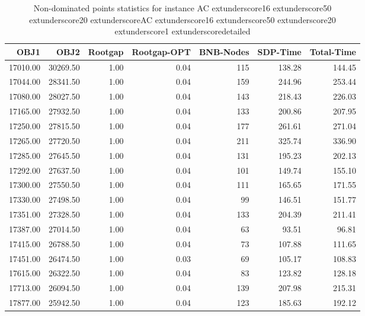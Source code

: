 \begin{table}
\caption{Non-dominated points statistics for instance AC	extunderscore16	extunderscore50	extunderscore20	extunderscoreAC	extunderscore16	extunderscore50	extunderscore20	extunderscore1	extunderscoredetailed}
\label{tab:stats/AC_16_50_20_AC_16_50_20_1_detailed}
\begin{tabular}{rrrrrrr}
\toprule
OBJ1 & OBJ2 & Rootgap & Rootgap-OPT & BNB-Nodes & SDP-Time & Total-Time \\
\midrule
17010.00 & 30269.50 & 1.00 & 0.04 & 115 & 138.28 & 144.45 \\
17044.00 & 28341.50 & 1.00 & 0.04 & 159 & 244.96 & 253.44 \\
17080.00 & 28027.50 & 1.00 & 0.04 & 143 & 218.43 & 226.03 \\
17165.00 & 27932.50 & 1.00 & 0.04 & 133 & 200.86 & 207.95 \\
17250.00 & 27815.50 & 1.00 & 0.04 & 177 & 261.61 & 271.04 \\
17265.00 & 27720.50 & 1.00 & 0.04 & 211 & 325.74 & 336.90 \\
17285.00 & 27645.50 & 1.00 & 0.04 & 131 & 195.23 & 202.13 \\
17292.00 & 27637.50 & 1.00 & 0.04 & 101 & 149.74 & 155.10 \\
17300.00 & 27550.50 & 1.00 & 0.04 & 111 & 165.65 & 171.55 \\
17330.00 & 27498.50 & 1.00 & 0.04 & 99 & 146.51 & 151.77 \\
17351.00 & 27328.50 & 1.00 & 0.04 & 133 & 204.39 & 211.41 \\
17387.00 & 27014.50 & 1.00 & 0.04 & 63 & 93.51 & 96.81 \\
17415.00 & 26788.50 & 1.00 & 0.04 & 73 & 107.88 & 111.65 \\
17451.00 & 26474.50 & 1.00 & 0.03 & 69 & 105.17 & 108.83 \\
17615.00 & 26322.50 & 1.00 & 0.04 & 83 & 123.82 & 128.18 \\
17713.00 & 26094.50 & 1.00 & 0.04 & 139 & 207.98 & 215.31 \\
17877.00 & 25942.50 & 1.00 & 0.04 & 123 & 185.63 & 192.12 \\
\bottomrule
\end{tabular}
\end{table}

